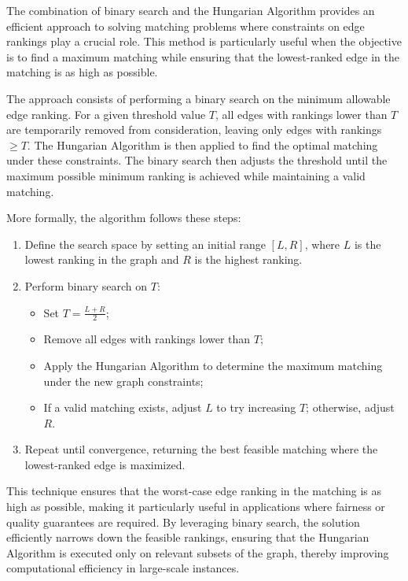         The combination of binary search and the Hungarian Algorithm provides an efficient approach to solving matching problems where constraints on edge rankings play a crucial role. This method is particularly useful when the objective is to find a maximum matching while ensuring that the lowest-ranked edge in the matching is as high as possible.
        
        The approach consists of performing a binary search on the minimum allowable edge ranking. For a given threshold value \( T \), all edges with rankings lower than \( T \) are temporarily removed from consideration, leaving only edges with rankings \(\geq T\). The Hungarian Algorithm is then applied to find the optimal matching under these constraints. The binary search then adjusts the threshold until the maximum possible minimum ranking is achieved while maintaining a valid matching.
        
        More formally, the algorithm follows these steps:
        
        \begin{enumerate}
            \item Define the search space by setting an initial range \([L, R]\), where \( L \) is the lowest ranking in the graph and \( R \) is the highest ranking.
            \item Perform binary search on \( T \):
            \begin{itemize}
                \item Set \( T = \frac{L + R}{2} \);
                \item Remove all edges with rankings lower than \( T \);
                \item Apply the Hungarian Algorithm to determine the maximum matching under the new graph constraints;
                \item If a valid matching exists, adjust \( L \) to try increasing \( T \); otherwise, adjust \( R \).
            \end{itemize}
            \item Repeat until convergence, returning the best feasible matching where the lowest-ranked edge is maximized.
        \end{enumerate}
        
        This technique ensures that the worst-case edge ranking in the matching is as high as possible, making it particularly useful in applications where fairness or quality guarantees are required. By leveraging binary search, the solution efficiently narrows down the feasible rankings, ensuring that the Hungarian Algorithm is executed only on relevant subsets of the graph, thereby improving computational efficiency in large-scale instances.
        
